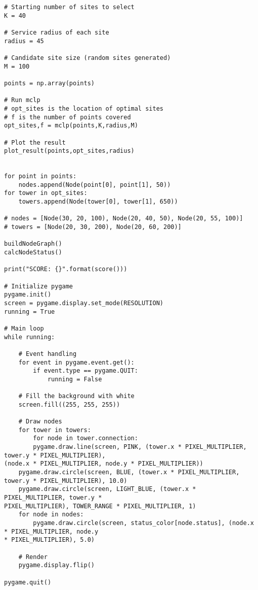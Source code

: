 \begin{singlespace}
\begin{verbatim}
# Starting number of sites to select
K = 40
 
# Service radius of each site
radius = 45
 
# Candidate site size (random sites generated)
M = 100
 
points = np.array(points)
 
# Run mclp 
# opt_sites is the location of optimal sites 
# f is the number of points covered
opt_sites,f = mclp(points,K,radius,M)
 
# Plot the result 
plot_result(points,opt_sites,radius)

 
for point in points:
    nodes.append(Node(point[0], point[1], 50))
for tower in opt_sites:
    towers.append(Node(tower[0], tower[1], 650))
 
# nodes = [Node(30, 20, 100), Node(20, 40, 50), Node(20, 55, 100)]
# towers = [Node(20, 30, 200), Node(20, 60, 200)]
 
buildNodeGraph()
calcNodeStatus()
 
print("SCORE: {}".format(score()))
 
# Initialize pygame
pygame.init()
screen = pygame.display.set_mode(RESOLUTION)
running = True
 
# Main loop
while running:
 
    # Event handling
    for event in pygame.event.get():
        if event.type == pygame.QUIT:
            running = False
 
    # Fill the background with white
    screen.fill((255, 255, 255))
 
    # Draw nodes
    for tower in towers:
    	for node in tower.connection:
    	pygame.draw.line(screen, PINK, (tower.x * PIXEL_MULTIPLIER, tower.y * PIXEL_MULTIPLIER), 
(node.x * PIXEL_MULTIPLIER, node.y * PIXEL_MULTIPLIER))
    pygame.draw.circle(screen, BLUE, (tower.x * PIXEL_MULTIPLIER, tower.y * PIXEL_MULTIPLIER), 10.0)
    pygame.draw.circle(screen, LIGHT_BLUE, (tower.x * PIXEL_MULTIPLIER, tower.y * 
PIXEL_MULTIPLIER), TOWER_RANGE * PIXEL_MULTIPLIER, 1)
    for node in nodes:
        pygame.draw.circle(screen, status_color[node.status], (node.x * PIXEL_MULTIPLIER, node.y 
* PIXEL_MULTIPLIER), 5.0)
    
    # Render
    pygame.display.flip()
 
pygame.quit()
 
	\end{verbatim}
	\end{singlespace}
